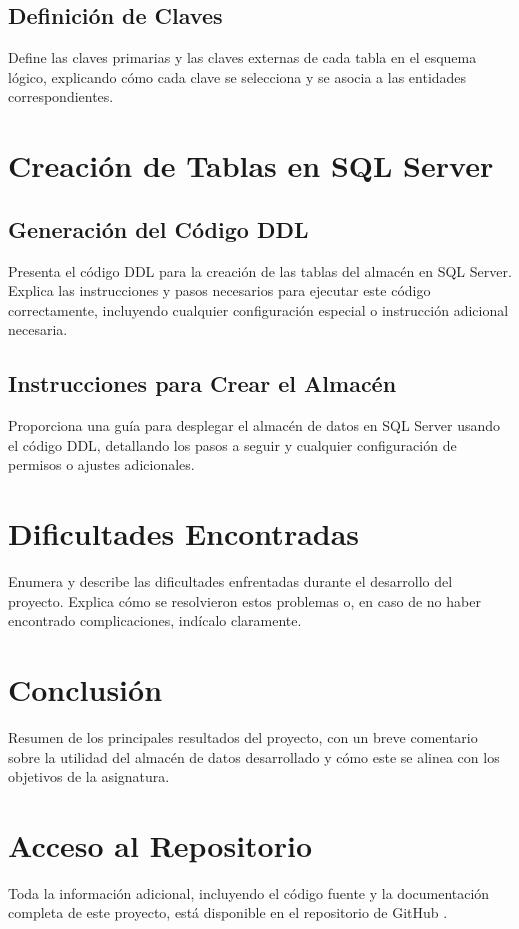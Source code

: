 \documentclass{article}
\begin{document}
\subsection{Definición de Claves}
Define las claves primarias y las claves externas de cada tabla en el esquema lógico, explicando cómo cada clave se selecciona y se asocia a las entidades correspondientes.

\section{Creación de Tablas en SQL Server}
\label{sec:creacion_tablas}
\subsection{Generación del Código DDL}
Presenta el código DDL para la creación de las tablas del almacén en SQL Server. Explica las instrucciones y pasos necesarios para ejecutar este código correctamente, incluyendo cualquier configuración especial o instrucción adicional necesaria.

\subsection{Instrucciones para Crear el Almacén}
Proporciona una guía para desplegar el almacén de datos en SQL Server usando el código DDL, detallando los pasos a seguir y cualquier configuración de permisos o ajustes adicionales.

\section{Dificultades Encontradas}
\label{sec:dificultades_encontradas}
Enumera y describe las dificultades enfrentadas durante el desarrollo del proyecto. Explica cómo se resolvieron estos problemas o, en caso de no haber encontrado complicaciones, indícalo claramente.

\section{Conclusión}
\label{sec:conclusion}
Resumen de los principales resultados del proyecto, con un breve comentario sobre la utilidad del almacén de datos desarrollado y cómo este se alinea con los objetivos de la asignatura.


\newpage
\section{Acceso al Repositorio}

Toda la información adicional, incluyendo el código fuente y la documentación completa de este proyecto, está disponible en el repositorio de GitHub \cite{silva2024github}.

\end{document}
